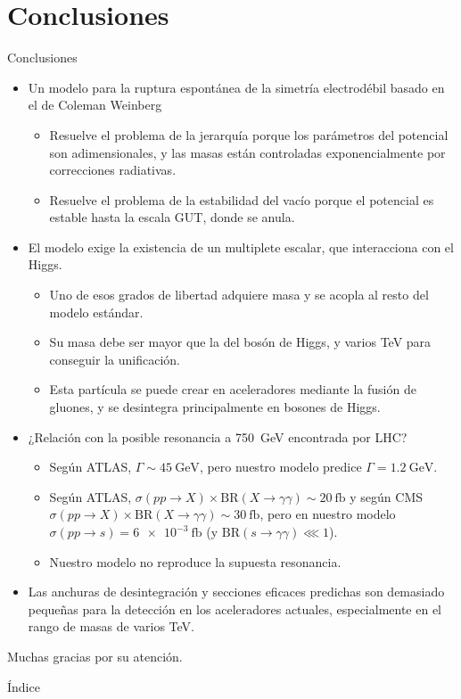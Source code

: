 \documentclass{beamer}
\begin{document}
\section{Conclusiones}
\begin{frame}{Conclusiones}
\begin{itemize}
\item<only@1> Un modelo para la ruptura espontánea de la simetría electrodébil basado en el de Coleman Weinberg
\begin{itemize}
\item Resuelve el problema de la jerarquía porque los parámetros del potencial son adimensionales, y las masas están controladas exponencialmente por correcciones radiativas.
\item Resuelve el problema de la estabilidad del vacío porque el potencial es estable hasta la escala GUT, donde se anula.
\end{itemize}
\item<only@2> El modelo exige la existencia de un multiplete escalar, que interacciona con el Higgs. 
\begin{itemize}
\item Uno de esos grados de libertad adquiere masa y se acopla al resto del modelo estándar.
\item Su masa debe ser mayor que la del bosón de Higgs, y varios \si{\tera\electronvolt} para conseguir la unificación.
\item Esta partícula se puede crear en aceleradores mediante la fusión de gluones, y se desintegra principalmente en bosones de Higgs. 
\end{itemize}
\item<only@3> ¿Relación con la posible resonancia a \SI{750}{\giga\electronvolt} encontrada por LHC?
\begin{itemize}
\item Según ATLAS, $\Gamma\sim \SI{45}{\giga\electronvolt}$, pero nuestro modelo predice $\Gamma = \SI{1.2}{\giga\electronvolt}$.
\item Según ATLAS, $\sigma(pp\to X)\times \mathrm{BR}(X \to \gamma\gamma) \sim \SI{20}{\femto\barn}$ y según CMS $\sigma(pp\to X)\times \mathrm{BR}(X \to \gamma\gamma) \sim \SI{30}{\femto\barn}$, pero en nuestro modelo $\sigma(pp\to s)= \SI{6e-3}{\femto\barn}$ (y $\mathrm{BR}(s \to \gamma\gamma)\lll 1$).
\item Nuestro modelo no reproduce la supuesta resonancia.
\end{itemize}
\item<only@3> Las anchuras de desintegración y secciones eficaces predichas son demasiado pequeñas para la detección en los aceleradores actuales, especialmente en el rango de masas de varios \si{\tera\electronvolt}.
\end{itemize}
\end{frame}

\begin{frame}
\begin{center}
\huge{Muchas gracias por su atención.}
\end{center}
\end{frame}


\begin{frame}[t]{Índice}
\tableofcontents
\end{frame}
\end{document}
